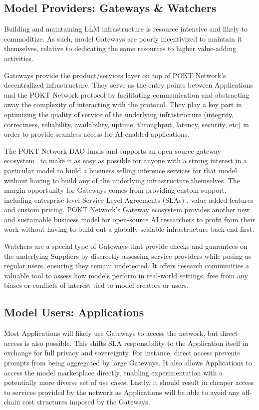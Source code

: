 \documentclass[conference,compsoc]{IEEEtran}
\begin{document}
\subsection{Model Providers: Gateways \& Watchers}

Building and maintaining LLM infrastructure is resource intensive and likely to commoditize. As such, model Gateways are poorly incentivized to maintain it themselves, relative to dedicating the same resources to higher value-adding activities.

Gateways provide the product/services layer on top of POKT Network’s decentralized infrastructure. They serve as the entry points between Applications and the POKT Network protocol by facilitating communication and abstracting away the complexity of interacting with the protocol. They play a key part in optimizing the quality of service of the underlying infrastructure (integrity, correctness, reliability, availability, uptime, throughput, latency, security, etc) in order to provide seamless access for AI-enabled applications.

The POKT Network DAO funds and supports an open-source gateway ecosystem~\cite{poktGatewayServer} to make it as easy as possible for anyone with a strong interest in a particular model to build a business selling inference services for that model without having to build any of the underlying infrastructure themselves. The margin opportunity for Gateways comes from providing custom support, including enterprise-level Service Level Agreements (SLAs) \cite{groveSLA}, value-added features and custom pricing. POKT Network’s Gateway ecosystem provides another new and sustainable business model for open-source AI researchers to profit from their work without having to build out a globally scalable infrastructure back-end first.

Watchers are a special type of Gateways that provide checks and guarantees on the underlying Suppliers by discreetly assessing service providers while posing as regular users, ensuring they remain undetected. It offers research communities a valuable tool to assess how models perform in real-world settings, free from any biases or conflicts of interest tied to model creators or users.


\subsection{Model Users: Applications}

Most Applications will likely use Gateways to access the network, but direct access is also possible. This shifts SLA responsibility to the Application itself in exchange for full privacy and sovereignty. For instance, direct access prevents prompts from being aggregated by large Gateways. It also allows Applications to access the model marketplace directly, enabling experimentation with a potentially more diverse set of use cases. Lastly, it should result in cheaper access to services provided by the network as Applications will be able to avoid any off-chain cost structures imposed by the Gateways. 
\end{document}
